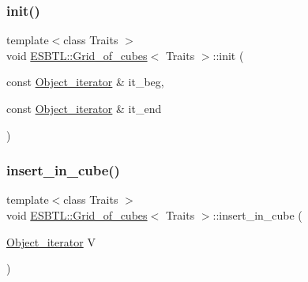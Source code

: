 \mbox{\label{structESBTL_1_1Grid__of__cubes_a64ac9192d8b9e8982a5eaa05a5755ce0}} 
\subsubsection{\texorpdfstring{init()}{init()}}
{\footnotesize\ttfamily template$<$class Traits $>$ \\
void \hyperlink{structESBTL_1_1Grid__of__cubes}{E\+S\+B\+T\+L\+::\+Grid\+\_\+of\+\_\+cubes}$<$ Traits $>$\+::init (\begin{DoxyParamCaption}\item[{const \hyperlink{structESBTL_1_1Grid__of__cubes_ae77665f05d6c7ae05c3d2d764df99193}{Object\+\_\+iterator} \&}]{it\+\_\+beg,  }\item[{const \hyperlink{structESBTL_1_1Grid__of__cubes_ae77665f05d6c7ae05c3d2d764df99193}{Object\+\_\+iterator} \&}]{it\+\_\+end }\end{DoxyParamCaption})\hspace{0.3cm}{\ttfamily [inline]}}

\mbox{\label{structESBTL_1_1Grid__of__cubes_a118fc01496c0106e4c3e8fb34c0e6b96}} 
\subsubsection{\texorpdfstring{insert\+\_\+in\+\_\+cube()}{insert\_in\_cube()}}
{\footnotesize\ttfamily template$<$class Traits $>$ \\
void \hyperlink{structESBTL_1_1Grid__of__cubes}{E\+S\+B\+T\+L\+::\+Grid\+\_\+of\+\_\+cubes}$<$ Traits $>$\+::insert\+\_\+in\+\_\+cube (\begin{DoxyParamCaption}\item[{\hyperlink{structESBTL_1_1Grid__of__cubes_ae77665f05d6c7ae05c3d2d764df99193}{Object\+\_\+iterator}}]{V }\end{DoxyParamCaption})\hspace{0.3cm}{\ttfamily [inline]}}

